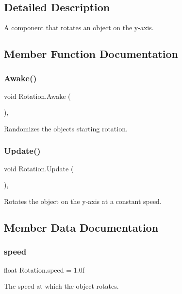 \subsection{Detailed Description}
A component that rotates an object on the y-\/axis. 



\subsection{Member Function Documentation}
\mbox{\label{class_rotation_adf4d306096c84d6cf221555cb6150d0f}} 
\subsubsection{\texorpdfstring{Awake()}{Awake()}}
{\footnotesize\ttfamily void Rotation.\+Awake (\begin{DoxyParamCaption}{ }\end{DoxyParamCaption})\hspace{0.3cm}{\ttfamily [inline]}, {\ttfamily [protected]}}



Randomizes the object\textquotesingle{}s starting rotation. 

\mbox{\label{class_rotation_a0bca908326feb819b54464ad1d600dc8}} 
\subsubsection{\texorpdfstring{Update()}{Update()}}
{\footnotesize\ttfamily void Rotation.\+Update (\begin{DoxyParamCaption}{ }\end{DoxyParamCaption})\hspace{0.3cm}{\ttfamily [inline]}, {\ttfamily [protected]}}



Rotates the object on the y-\/axis at a constant speed. 



\subsection{Member Data Documentation}
\mbox{\label{class_rotation_a9f02f6a4f4552b25304ae090cf65d5e3}} 
\subsubsection{\texorpdfstring{speed}{speed}}
{\footnotesize\ttfamily float Rotation.\+speed = 1.\+0f}



The speed at which the object rotates. 

